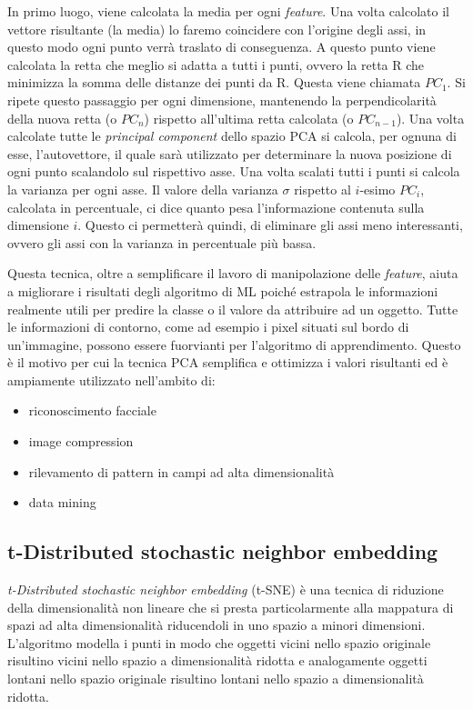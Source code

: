 \documentclass[12pt,italian]{report}
\begin{document}
In primo luogo, viene calcolata la media per ogni \emph{feature}. Una volta calcolato il vettore risultante (la media) lo faremo coincidere con l'origine degli assi, in questo modo ogni punto verrà traslato di conseguenza. A questo punto viene calcolata la retta che meglio si adatta a tutti i punti, ovvero la retta R che minimizza la somma delle distanze dei punti da R. Questa viene chiamata $ PC_{1} $. Si ripete questo passaggio per ogni dimensione, mantenendo la perpendicolarità della nuova retta (o $ PC_{n} $) rispetto all'ultima retta calcolata (o $ PC_{n-1} $). 
Una volta calcolate tutte le \emph{principal component} dello spazio PCA si calcola, per ognuna di esse, l'autovettore, il quale sarà utilizzato per determinare la nuova posizione di ogni punto scalandolo sul rispettivo asse. Una volta scalati tutti i punti si calcola la varianza per ogni asse. Il valore della varianza $\sigma$ rispetto al $i$-esimo $ PC_i $, calcolata in percentuale, ci dice quanto pesa l'informazione contenuta sulla dimensione $i$. Questo ci permetterà quindi, di eliminare gli assi meno interessanti, ovvero gli assi con la varianza in percentuale più bassa. 

Questa tecnica, oltre a semplificare il lavoro di manipolazione delle \emph{feature}, aiuta a migliorare i risultati degli algoritmo di ML poiché estrapola le informazioni realmente utili per predire la classe o il valore da attribuire ad un oggetto. Tutte le informazioni di contorno, come ad esempio i pixel situati sul bordo di un'immagine, possono essere fuorvianti per l'algoritmo di apprendimento. Questo è il motivo per cui la tecnica PCA semplifica e ottimizza i valori risultanti ed è ampiamente utilizzato nell'ambito di:
\begin{itemize}
	\item riconoscimento facciale
	\item image compression
	\item rilevamento di pattern in campi ad alta dimensionalità
	\item data mining
\end{itemize}

\subsection{t-Distributed stochastic neighbor embedding}
\emph{t-Distributed stochastic neighbor embedding} (t-SNE) è una tecnica di riduzione della dimensionalità non lineare che si presta particolarmente alla mappatura di spazi ad alta dimensionalità riducendoli in uno spazio a minori dimensioni. L'algoritmo modella i punti in modo che oggetti vicini nello spazio originale risultino vicini nello spazio a dimensionalità ridotta e analogamente oggetti lontani nello spazio originale risultino lontani nello spazio a dimensionalità ridotta.
\end{document}
